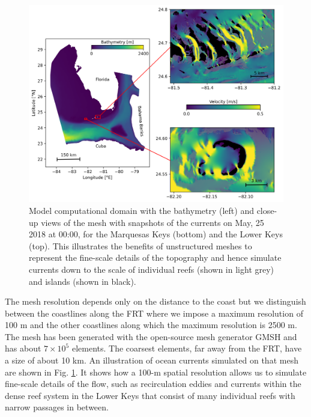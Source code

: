 \documentclass[utf8]{frontiersSCNS}
\begin{document}
\begin{figure}
    \centering
    \includegraphics[width=.9\textwidth]{figures/setup_3.png}
    \caption{Model computational domain with the bathymetry (left) and close-up views of the mesh with snapshots of the currents on May, 25 2018 at 00:00, for the Marquesas Keys (bottom) and the Lower Keys (top). This illustrates the benefits of unstructured meshes to represent the fine-scale details of the topography and hence simulate currents down to the scale of individual reefs (shown in light grey) and islands (shown in black).}
    \label{fig:setup}
\end{figure}

The mesh resolution depends only on the distance to the coast but we distinguish between the coastlines along the FRT where we impose a maximum resolution of 100 m and the other coastlines along which the maximum resolution is 2500 m. The mesh has been generated with the open-source mesh generator GMSH \citep{Geuzaine2009} and has about $7 \times 10^5$ elements. The coarsest elements, far away from the FRT, have a size of about 10 km. An illustration of ocean currents simulated on that mesh are shown in Fig. \ref{fig:setup}. It shows how a 100-m spatial resolution allows us to simulate fine-scale details of the flow, such as recirculation eddies and currents within the dense reef system in the Lower Keys that consist of many individual reefs with narrow passages in between. 
\end{document}

